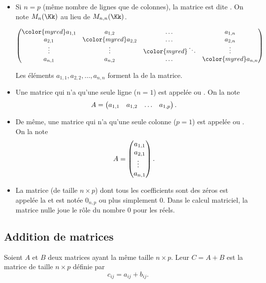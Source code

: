 \documentclass[class=report,crop=false]{standalone}
\begin{document}
\begin{itemize}
  \item Si $n=p$ (même nombre de lignes que de colonnes), la matrice est dite 
  .
  On note $M_{n}(\Kk)$ au lieu de $M_{n,n}(\Kk)$.

  \[
\begin{pmatrix}
 {\color{myred}a_{1,1}} & a_{1,2} & \dots & a_{1,n}\\
 a_{2,1} & {\color{myred}a_{2,2}} & \dots & a_{2,n}\\
 \vdots& \vdots & {\color{myred}\ddots}  & \vdots\\
 a_{n,1} & a_{n,2} & \dots & {\color{myred}a_{n,n}}
\end{pmatrix}
 \]

 Les éléments $a_{1,1}, a_{2,2}, \ldots, a_{n,n}$ forment la 
 de la matrice.

  \item  Une matrice qui n'a qu'une seule ligne ($n=1$) est appelée 
  ou . On la note
$$A=\begin{pmatrix}
a_{1,1}& a_{1,2}&  \ldots & a_{1,p}\cr
\end{pmatrix}.$$

  \item De même, une matrice qui n'a qu'une seule colonne ($p=1$) est appelée  ou . On la note
$$A=\begin{pmatrix}
a_{1,1}\cr
a_{2,1}\cr
\enspace \vdots \hfill \cr
a_{n,1}\cr
\end{pmatrix}.$$


  \item La matrice (de taille $n\times p$) dont tous les coefficients sont des zéros
est appelée la  et est notée $0_{n,p}$ ou plus simplement $0$.
Dans le calcul matriciel, la matrice nulle joue le rôle du nombre $0$ pour les réels.

\end{itemize}


\subsection{Addition de matrices}


\begin{definition}
Soient $A$ et $B$ deux matrices ayant la même taille $n\times p$.
Leur  $C=A+B$ est la matrice de taille $n\times p$ définie par
\[c_{ij}=a_{ij}+b_{ij}.\]
\end{definition}
\end{document}
